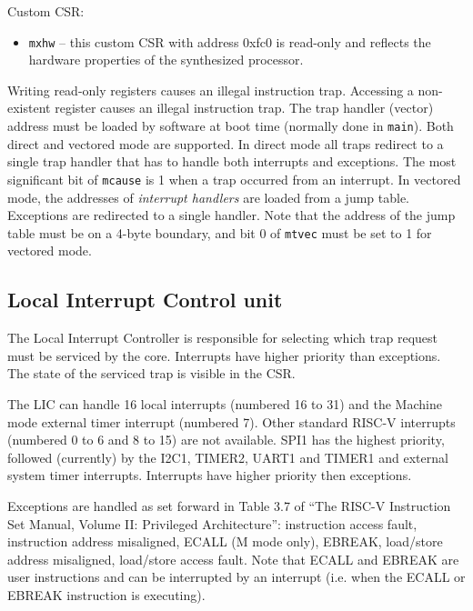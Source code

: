 \documentclass[12pt]{article}
\begin{document}
Custom CSR:

\begin{itemize}
\item \lstinline|mxhw| -- this custom CSR with address 0xfc0 is read-only and reflects the hardware properties of the synthesized processor.
\end{itemize}

Writing read-only registers causes an illegal instruction trap. Accessing a non-existent register causes an illegal instruction trap. The trap handler (vector) address must be loaded by software at boot time (normally done in \lstinline|main|). Both direct and vectored mode are supported. In direct mode all traps redirect to a single trap handler that has to handle both interrupts and exceptions. The most significant bit of \lstinline|mcause| is 1 when a trap occurred from an interrupt. In vectored mode, the addresses of \emph{interrupt handlers} are loaded from a jump table. Exceptions are redirected to a single handler. Note that the address of the jump table must be on a 4-byte boundary, and bit 0 of \lstinline|mtvec| must be set to 1 for vectored mode.


\subsection{Local Interrupt Control unit}
The Local Interrupt Controller is responsible for selecting which trap request must be serviced by the core. Interrupts have higher priority than exceptions. The state of the serviced trap is visible in the CSR.

The LIC can handle 16 local interrupts (numbered 16 to 31) and the Machine mode external timer interrupt (numbered 7). Other standard RISC-V interrupts (numbered 0 to 6 and 8 to 15) are not available. SPI1 has the highest priority, followed (currently) by the I2C1, TIMER2, UART1 and TIMER1 and external system timer interrupts. Interrupts have higher priority then exceptions.

Exceptions are handled as set forward in Table 3.7 of ``The RISC-V Instruction Set Manual, Volume II: Privileged Architecture'': instruction access fault, instruction address misaligned, ECALL (M mode only), EBREAK, load/store address misaligned, load/store access fault. Note that ECALL and EBREAK are user instructions and can be interrupted by an interrupt (i.e. when the ECALL or EBREAK instruction is executing).
\end{document}
